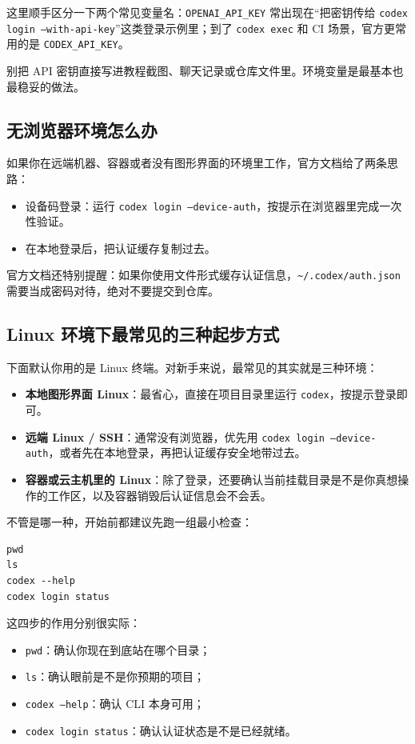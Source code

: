 \documentclass[UTF8,a4paper,12pt]{ctexart}
\begin{document}
这里顺手区分一下两个常见变量名：\texttt{OPENAI\_API\_KEY} 常出现在“把密钥传给 \texttt{codex login --with-api-key}”这类登录示例里；到了 \texttt{codex exec} 和 CI 场景，官方更常用的是 \texttt{CODEX\_API\_KEY}。

\begin{warnbox}
别把 API 密钥直接写进教程截图、聊天记录或仓库文件里。环境变量是最基本也最稳妥的做法。
\end{warnbox}

\subsection{无浏览器环境怎么办}

如果你在远端机器、容器或者没有图形界面的环境里工作，官方文档给了两条思路：
\begin{itemize}
  \item 设备码登录：运行 \texttt{codex login --device-auth}，按提示在浏览器里完成一次性验证。
  \item 在本地登录后，把认证缓存复制过去。
\end{itemize}

官方文档还特别提醒：如果你使用文件形式缓存认证信息，\texttt{\textasciitilde/.codex/auth.json} 需要当成密码对待，绝对不要提交到仓库。

\subsection{Linux 环境下最常见的三种起步方式}

下面默认你用的是 Linux 终端。对新手来说，最常见的其实就是三种环境：
\begin{itemize}
  \item \textbf{本地图形界面 Linux}：最省心，直接在项目目录里运行 \texttt{codex}，按提示登录即可。
  \item \textbf{远端 Linux / SSH}：通常没有浏览器，优先用 \texttt{codex login --device-auth}，或者先在本地登录，再把认证缓存安全地带过去。
  \item \textbf{容器或云主机里的 Linux}：除了登录，还要确认当前挂载目录是不是你真想操作的工作区，以及容器销毁后认证信息会不会丢。
\end{itemize}

不管是哪一种，开始前都建议先跑一组最小检查：

\begin{lstlisting}[style=cli]
pwd
ls
codex --help
codex login status
\end{lstlisting}

这四步的作用分别很实际：
\begin{itemize}
  \item \texttt{pwd}：确认你现在到底站在哪个目录；
  \item \texttt{ls}：确认眼前是不是你预期的项目；
  \item \texttt{codex --help}：确认 CLI 本身可用；
  \item \texttt{codex login status}：确认认证状态是不是已经就绪。
\end{itemize}
\end{document}

